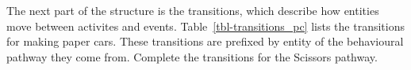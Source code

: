 \documentclass[
  10pt,
  a4paperpaper,
  DIV=11,
  numbers=noendperiod,
  oneside]{scrreprt}
\begin{document}
\begin{table}

\caption{\label{tbl-entities_pc}List of Entities}


\end{table}%

The next part of the structure is the transitions, which describe how
entities move between activites and events.
Table~\ref{tbl-transitions_pc} lists the transitions for making paper
cars. These transitions are prefixed by entity of the behavioural
pathway they come from. Complete the transitions for the Scissors
pathway.
\end{document}

